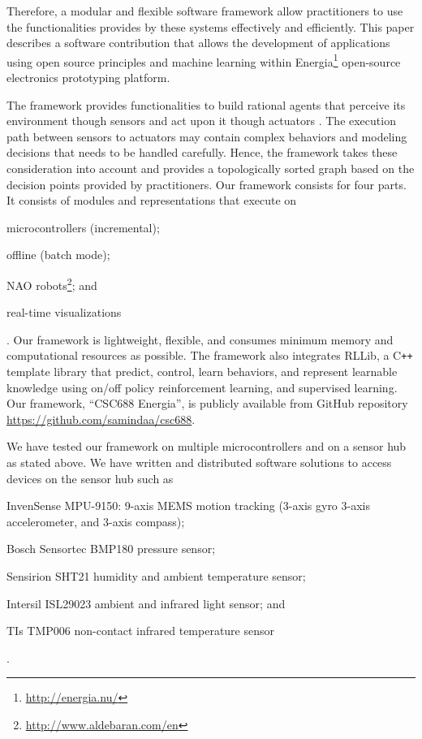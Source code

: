 \documentclass[letterpaper]{article}
\begin{document}
Therefore, a modular and flexible software
framework allow practitioners to use the functionalities provides by these systems effectively
and efficiently. This paper describes a software contribution that allows the development of
applications using open source principles and machine learning within
Energia\footnote{\url{http://energia.nu/}} open-source electronics prototyping platform.



The framework provides functionalities to build  rational agents that perceive its
environment though sensors and act upon it though actuators \cite{russel2009}. The execution path
between sensors to actuators may contain complex behaviors and modeling decisions that needs to be
handled carefully. Hence, the framework takes these consideration into account and provides a
topologically sorted graph based on the decision points provided by practitioners. Our
framework consists for four parts. It consists of modules and representations that execute on
\begin{inparaenum}[(1)]\item microcontrollers (incremental); \item offline (batch mode); \item NAO
robots\footnote{\url{http://www.aldebaran.com/en}}; and \item real-time
visualizations\end{inparaenum}. Our framework is lightweight, flexible, and consumes minimum memory
and computational resources as
possible. The framework also integrates RLLib, a C\texttt{++} template library that predict,
control, learn behaviors, and represent learnable knowledge using on/off policy reinforcement
learning, and supervised learning. Our framework, ``CSC688 Energia'', is publicly available from
GitHub repository \url{https://github.com/samindaa/csc688}.

We have tested our framework on multiple microcontrollers and on a sensor hub as stated above. We
have written and distributed software solutions to access devices on the sensor hub such as
\begin{inparaenum}[(1)] \item InvenSense MPU-9150: 9-axis MEMS motion tracking (3-axis gyro
3-axis accelerometer, and 3-axis compass); \item Bosch Sensortec BMP180 pressure sensor; \item
Sensirion SHT21 humidity and ambient temperature sensor; \item Intersil ISL29023 ambient and
infrared light sensor; and \item TIs TMP006 non-contact infrared temperature sensor\end{inparaenum}.
\end{document}
